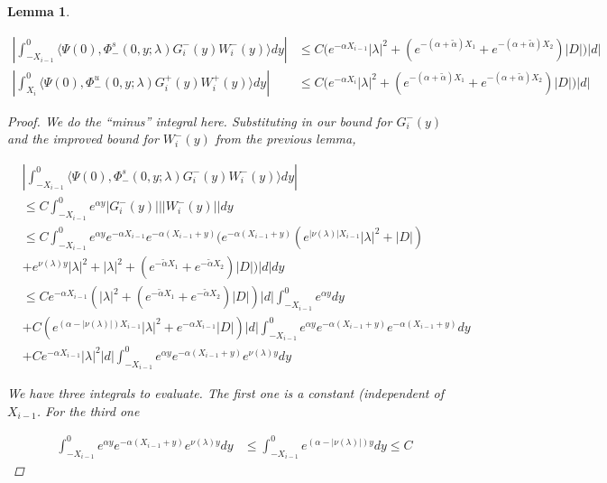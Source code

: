 \documentclass[12pt]{article}
\newtheorem{lemma}{Lemma}
\begin{document}
\begin{lemma}\label{noncenterW}

\begin{align*}
\left| \int_{-X_{i-1}}^0 \langle \Psi(0), \Phi^s_-(0, y; \lambda) G_i^-(y) W_i^-(y) \rangle dy \right| &\leq C \Big( e^{-\alpha X_{i-1}} |\lambda|^2 + (e^{-(\alpha + \tilde{\alpha}) X_1} + e^{-(\alpha + \tilde{\alpha}) X_2})|D| \Big) |d| \\
\left| \int_{X_i}^0 \langle \Psi(0), \Phi^u_-(0, y; \lambda) G_i^+(y) W_i^+(y) \rangle dy \right| &\leq C \Big( e^{-\alpha X_i} |\lambda|^2 + (e^{-(\alpha + \tilde{\alpha}) X_1} + e^{-(\alpha + \tilde{\alpha}) X_2})|D| \Big) |d|
\end{align*}

\begin{proof}

We do the ``minus'' integral here. Substituting in our bound for $G_i^-(y)$ and the improved bound for $W_i^-(y)$ from the previous lemma,

\begin{align*}
&\left| \int_{-X_{i-1}}^0 \langle \Psi(0), \Phi^s_-(0, y; \lambda) G_i^-(y) W_i^-(y) \rangle dy \right| \\
&\leq C \int_{-X_{i-1}}^0 e^{\alpha y} |G_i^-(y)| ||W_i^-(y)|| dy \\
&\leq C \int_{-X_{i-1}}^0 e^{\alpha y} e^{-\alpha X_{i-1}} e^{-\alpha(X_{i-1} + y)} \Big(e^{-\alpha(X_{i-1} + y)}( e^{|\nu(\lambda)| X_{i-1}} |\lambda|^2 + |D|) \\
&+ e^{\nu(\lambda)y} |\lambda|^2 
+ |\lambda|^2 + (e^{-\tilde{\alpha} X_1} + e^{-\tilde{\alpha} X_2}) |D| \Big) |d| dy \\
&\leq C e^{-\alpha X_{i-1}} (|\lambda|^2 + (e^{-\tilde{\alpha} X_1} + e^{-\tilde{\alpha} X_2}) |D| ) |d| \int_{-X_{i-1}}^0 e^{\alpha y} dy \\
&+ C ( e^{(\alpha - |\nu(\lambda)|) X_{i-1}} |\lambda|^2 + e^{-\alpha X_{i-1}} |D|)|d|\int_{-X_{i-1}}^0 e^{\alpha y} e^{-\alpha(X_{i-1} + y)} e^{-\alpha(X_{i-1} + y)} dy \\
&+ C e^{-\alpha X_{i-1}} |\lambda|^2 |d| \int_{-X_{i-1}}^0 e^{\alpha y} e^{-\alpha(X_{i-1} + y)} e^{\nu(\lambda)y} dy
\end{align*}

We have three integrals to evaluate. The first one is a constant (independent of $X_{i-1}$. For the third one

\begin{align*}
\int_{-X_{i-1}}^0 e^{\alpha y} e^{-\alpha(X_{i-1} + y)} e^{\nu(\lambda)y} dy 
&\leq \int_{-X_{i-1}}^0 e^{(\alpha - |\nu(\lambda)|) y} dy \leq C
\end{align*}


\end{proof}
\end{lemma}
\end{document}
